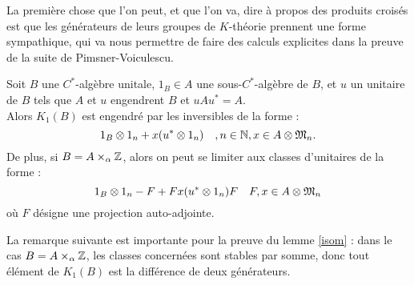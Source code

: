 La première chose que l'on peut, et que l'on va, dire à propos des produits croisés est que les générateurs de leurs groupes de $K$-théorie prennent une forme sympathique, qui va nous permettre de faire des calculs explicites dans la preuve de la suite de Pimsner-Voiculescu.\\

\begin{lem}\label{generateur}
Soit $B$ une $C^*$-algèbre unitale, $1_B\in A$ une sous-$C^*$-algèbre de $B$, et $u$ un unitaire de $B$ tels que $A$ et $u$ engendrent $B$ et $uAu^*=A$.\\
Alors $K_1(B)$ est engendré par les inversibles de la forme :
\[1_B\otimes 1_n +x(u^*\otimes 1_n)\quad , n\in\mathbb N,  x\in A\otimes \frak M_n.\]
De plus, si $B=A\times_\alpha \mathbb Z$, alors on peut se limiter aux classes d'unitaires de la forme :
\[1_B\otimes 1_n-F+Fx(u^*\otimes 1_n)F\quad F,x\in A\otimes\frak M_n\]
où $F$ désigne une projection auto-adjointe. 
\end{lem}

La remarque suivante est importante pour la preuve du lemme \ref{isom} : dans le cas $B=A\times_\alpha \mathbb Z$, les classes concernées sont stables par somme, donc tout élément de $K_1(B)$ est la différence de deux générateurs.\\

